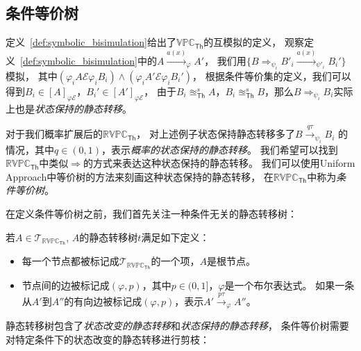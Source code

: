 \subsection{条件等价树}
   定义~\ref{def:symbolic_bisimulation}给出了$\mathbb{VPC}_{\mathsf{Th}}$的互模拟的定义，
   观察定义~\ref{def:symbolic_bisimulation}中的$A\stackrel{a(x)}{\longrightarrow}_{\varphi} A'$，
   我们用$\{B\Rightarrow_{\psi_i}B'_i\stackrel{a(x)}{\longrightarrow}_{\psi'_i}B_i'\}$模拟，
   其中$(\varphi_i A\mathcal{E}\varphi_i B_i)\wedge(\varphi_i A'\mathcal{E}\varphi_i B_i')$，
   根据条件等价集的定义，我们可以得到$B_i\in [A]_{\varphi\mathcal{E}}$，$B_i'\in [A']_{\varphi \mathcal{E}}$，
   由于$B_i \approxeq_{\mathsf{Th}}^s A$，$B_i\approxeq_{\mathsf{Th}}^s B$，那么$B\Rightarrow_{\psi_i}B_i$实际上也是\textit{状态保持的静态转移}。

   对于我们概率扩展后的$\mathbb{RVPC}_{\mathsf{Th}}$，
   对上述例子状态保持静态转移多了$B\stackrel{q\tau}{\rightarrow}_{\psi_i} B_i$
   的情况，其中$q\in(0,1)$，表示\textit{概率的状态保持的静态转移}。
   我们希望可以找到$\mathbb{RVPC}_{\mathsf{Th}}$中类似$\Rightarrow$的方式来表达这种状态保持的静态转移。
   我们可以使用Uniform Approach中等价树的方法来刻画这种状态保持的静态转移，
   在$\mathbb{RVPC}_{\mathsf{Th}}$中称为\textit{条件等价树}。

   在定义条件等价树之前，我们首先关注一种条件无关的静态转移树：
\begin{definition}[静态转移树]
   \label{def:silent_tree}
   若$A\in \mathcal{T}_{\mathbb{RVPC}_{\mathsf{Th}}}$,
   $A$的静态转移树$t$满足如下定义：
   \begin{itemize}
   \item 每一个节点都被标记成$\mathcal{T}_{\mathbb{RVPC}_{\mathsf{Th}}}$的一个项，$A$是根节点。
   \item {
      节点间的边被标记成$(\varphi,p)$，其中$p\in(0,1]$，$\varphi$是一个布尔表达式。
      如果一条从$A'$到$A''$的有向边被标记成$(\varphi,p)$，表示$A'\stackrel{p\tau}{\rightarrow}_{\varphi} A''$。
   }
   \end{itemize}
\end{definition}

静态转移树包含了\textit{状态改变的静态转移}和\textit{状态保持的静态转移}，
条件等价树需要对特定条件下的状态改变的静态转移进行剪枝：

